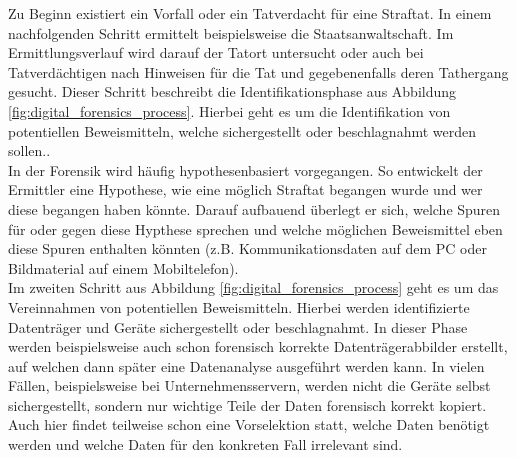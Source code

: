 \noindent
Zu Beginn existiert ein Vorfall oder ein Tatverdacht für eine Straftat. In einem nachfolgenden Schritt ermittelt beispielsweise die Staatsanwaltschaft. Im Ermittlungsverlauf wird darauf der Tatort untersucht oder auch bei Tatverdächtigen nach Hinweisen für die Tat und gegebenenfalls deren Tathergang gesucht. Dieser Schritt beschreibt die Identifikationsphase aus Abbildung \ref{fig:digital_forensics_process}. Hierbei geht es um die Identifikation von potentiellen Beweismitteln, welche sichergestellt oder beschlagnahmt werden sollen.\cite[S. 17-24]{digital_forensics}.\\ In der Forensik wird häufig hypothesenbasiert vorgegangen. So entwickelt der Ermittler eine Hypothese, wie eine möglich Straftat begangen wurde und wer diese begangen haben könnte. Darauf aufbauend überlegt er sich, welche Spuren für oder gegen diese Hypthese sprechen und welche möglichen Beweismittel eben diese Spuren enthalten könnten (z.B. Kommunikationsdaten auf dem PC oder Bildmaterial auf einem Mobiltelefon).\\

\noindent
Im zweiten Schritt aus Abbildung \ref{fig:digital_forensics_process} geht es um das Vereinnahmen von potentiellen Beweismitteln. Hierbei werden identifizierte Datenträger und Geräte sichergestellt oder beschlagnahmt. In dieser Phase werden beispielsweise auch schon forensisch korrekte Datenträgerabbilder erstellt, auf welchen dann später eine Datenanalyse ausgeführt werden kann.\cite[S. 24-33]{digital_forensics} In vielen Fällen, beispielsweise bei Unternehmensservern, werden nicht die Geräte selbst sichergestellt, sondern nur wichtige Teile der Daten forensisch korrekt kopiert. Auch hier findet teilweise schon eine Vorselektion statt, welche Daten benötigt werden und welche Daten für den konkreten Fall irrelevant sind.\\


